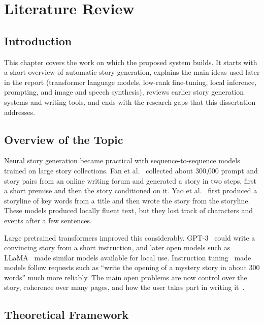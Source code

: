 \chapter{Literature Review}
\label{ch:litreview}

\section{Introduction}
\label{sec:lit-intro}

This chapter covers the work on which the proposed system builds. It starts with a short overview of automatic story generation, explains the main ideas used later in the report (transformer language models, low-rank fine-tuning, local inference, prompting, and image and speech synthesis), reviews earlier story generation systems and writing tools, and ends with the research gaps that this dissertation addresses.

\section{Overview of the Topic}
\label{sec:lit-overview}

Neural story generation became practical with sequence-to-sequence models trained on large story collections. Fan et al.~\cite{fan2018hierarchical} collected about 300,000 prompt and story pairs from an online writing forum and generated a story in two steps, first a short premise and then the story conditioned on it. Yao et al.~\cite{yao2019planwrite} first produced a storyline of key words from a title and then wrote the story from the storyline. These models produced locally fluent text, but they lost track of characters and events after a few sentences.

Large pretrained transformers improved this considerably. GPT-3~\cite{brown2020gpt3} could write a convincing story from a short instruction, and later open models such as LLaMA~\cite{touvron2023llama} made similar models available for local use. Instruction tuning~\cite{ouyang2022rlhf} made models follow requests such as ``write the opening of a mystery story in about 300 words'' much more reliably. The main open problems are now control over the story, coherence over many pages, and how the user takes part in writing it~\cite{zhao2023llmsurvey}.

\section{Theoretical Framework}
\label{sec:lit-theory}

